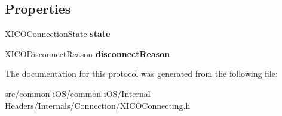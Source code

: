 \subsection*{Properties}
\begin{DoxyCompactItemize}
\item 
\hypertarget{protocol_x_i_c_o_connecting_01-p_a26354c54313216cca497dcdbb040218b}{}\label{protocol_x_i_c_o_connecting_01-p_a26354c54313216cca497dcdbb040218b} 
X\+I\+C\+O\+Connection\+State {\bfseries state}
\item 
\hypertarget{protocol_x_i_c_o_connecting_01-p_ac8cbf7c6bb777247fc646e5fe5e60823}{}\label{protocol_x_i_c_o_connecting_01-p_ac8cbf7c6bb777247fc646e5fe5e60823} 
X\+I\+C\+O\+Disconnect\+Reason {\bfseries disconnect\+Reason}
\end{DoxyCompactItemize}


The documentation for this protocol was generated from the following file\+:\begin{DoxyCompactItemize}
\item 
src/common-\/i\+O\+S/common-\/i\+O\+S/\+Internal Headers/\+Internals/\+Connection/X\+I\+C\+O\+Connecting.\+h\end{DoxyCompactItemize}
